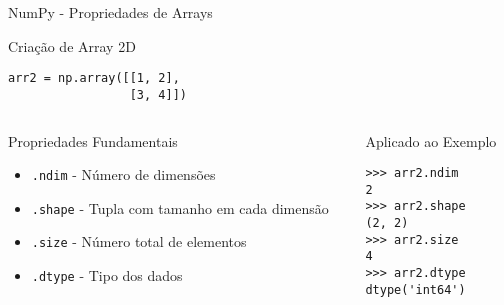 


\begin{frame}[fragile]{NumPy - Propriedades de Arrays}

\begin{block}{Criação de Array 2D}
\begin{verbatim}
arr2 = np.array([[1, 2], 
                 [3, 4]])
\end{verbatim}
\end{block}

\begin{columns}[T]
    \begin{column}{0.6\textwidth}
        \begin{exampleblock}{Propriedades Fundamentais}
            \begin{itemize}
                \item \texttt{.ndim} - Número de dimensões
                \item \texttt{.shape} - Tupla com tamanho em cada dimensão
                \item \texttt{.size} - Número total de elementos
                \item \texttt{.dtype} - Tipo dos dados
            \end{itemize}
        \end{exampleblock}
\end{column}
    
    \begin{column}{0.4\textwidth}
        \begin{alertblock}{Aplicado ao Exemplo}
\begin{verbatim}
>>> arr2.ndim
2
>>> arr2.shape
(2, 2)
>>> arr2.size
4
>>> arr2.dtype
dtype('int64')
\end{verbatim}
        \end{alertblock}

    \end{column}
\end{columns}
\end{frame}

